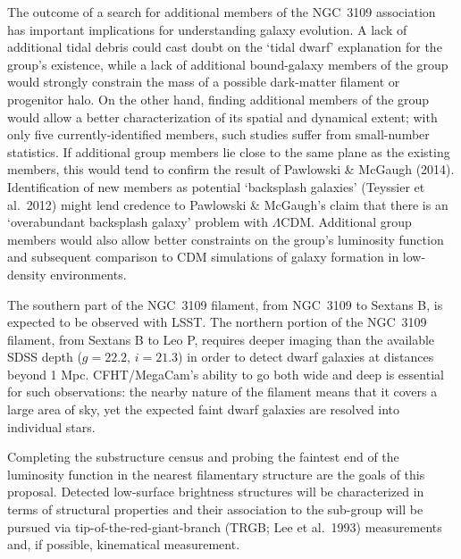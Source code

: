 The outcome of a search for additional members of the NGC~3109 association has important implications for
understanding galaxy evolution. A lack of additional tidal debris could cast doubt on the `tidal dwarf' 
explanation for the group's existence, while a lack of additional bound-galaxy members of the group 
would strongly constrain the mass of a possible dark-matter filament or progenitor halo.
On the other hand, finding additional members of the group would allow a better characterization of its
spatial and dynamical extent; with only five currently-identified members, such studies 
suffer from small-number statistics. If additional group members lie close to the same plane
as the existing members, this would tend to confirm the result of Pawlowski \& McGaugh (2014). 
Identification of new members as potential `backsplash galaxies' (Teyssier et al.\ 2012) might lend credence to 
 Pawlowski \& McGaugh's
claim that there is an `overabundant backsplash galaxy' problem with $\Lambda$CDM.
Additional group members 
would also allow better constraints on the group's  luminosity function and subsequent comparison to CDM 
simulations of galaxy formation in  low-density environments.




The southern part of the NGC~3109 filament, from NGC~3109 to Sextans B, is expected to be observed with LSST.
The northern portion of  the NGC~3109 filament, from Sextans B to Leo P, requires deeper imaging than
the available  SDSS  depth ($g=22.2$, $i=21.3$) in order to detect dwarf galaxies at distances beyond 1 Mpc.
CFHT/MegaCam's ability to go both wide and deep is essential for such observations: the nearby nature of the 
filament means that it covers a large area of sky, yet the expected faint dwarf galaxies are resolved into individual stars.


Completing the substructure census and probing the faintest end of the luminosity function in the nearest filamentary 
structure are the goals of this proposal. Detected low-surface brightness structures will be characterized in terms of 
structural properties and their association to the sub-group will be pursued via tip-of-the-red-giant-branch 
(TRGB; Lee et al.\ 1993) measurements and, if possible, kinematical measurement.


